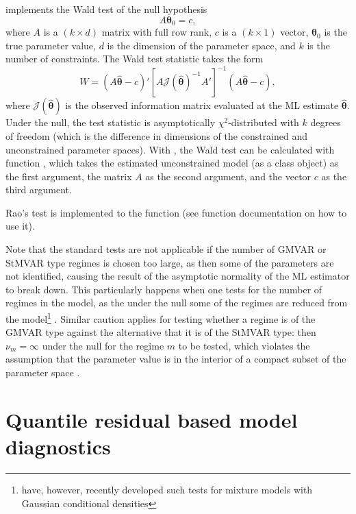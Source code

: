 \documentclass[nojss]{jss}
\begin{document}
 implements the Wald test of the null hypothesis
\begin{equation}
A\boldsymbol{\theta}_0 = c,
\end{equation}
where $A$ is a $(k \times d)$ matrix with full row rank, $c$ is a $(k \times 1)$ vector, $\boldsymbol{\theta}_0$ is the true parameter value, $d$ is the dimension of the parameter space, and $k$ is the number of constraints. The Wald test statistic takes the form
\begin{equation}
W = (A\hat{\boldsymbol{\theta}} - c)' [A\mathcal{J}(\hat{\boldsymbol{\theta}})^{-1}A']^{-1}(A\hat{\boldsymbol{\theta}} - c),
\end{equation}
where $\mathcal{J}(\hat{\boldsymbol{\theta}})$ is the observed information matrix evaluated at the ML estimate $\hat{\boldsymbol{\theta}}$. Under the null, the test statistic is asymptotically $\chi^2$-distributed with $k$ degrees of freedom (which is the difference in dimensions of the constrained and unconstrained parameter spaces). With , the Wald test can be calculated with function , which takes the estimated unconstrained model (as a class  object) as the first argument, the matrix $A$ as the second argument, and the vector $c$ as the third argument.

Rao's test is implemented to the function  (see function documentation on how to use it).

Note that the standard tests are not applicable if the number of GMVAR or StMVAR type regimes is chosen too large, as then some of the parameters are not identified, causing the result of the asymptotic normality of the ML estimator to break down. This particularly happens when one tests for the number of regimes in the model, as the under the null some of the regimes are reduced from the model\footnote{\cite{Meitz+Saikkonen:2021} have, however, recently developed such tests for mixture models with Gaussian conditional densities} \citep[see the related discussion in][]{Virolainen2:2021}. Similar caution applies for testing whether a regime is of the GMVAR type against the alternative that it is of the StMVAR type: then $\nu_m = \infty$ under the null for the regime $m$ to be tested, which violates the assumption that the parameter value is in the interior of a compact subset of the parameter space \citep[see][Theorem 3 and Assumption 1]{Virolainen2:2021}.


\section{Quantile residual based model diagnostics}\label{sec:qres}
\end{document}
